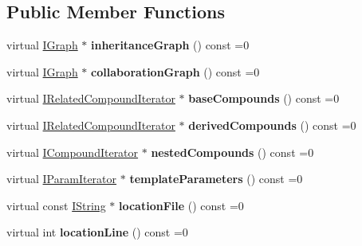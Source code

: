 \subsection*{Public Member Functions}
\begin{DoxyCompactItemize}
\item 
\mbox{\label{class_i_class_a4ca5777a61f96db43cee552fae9ddf10}} 
virtual \mbox{\hyperlink{class_i_graph}{I\+Graph}} $\ast$ {\bfseries inheritance\+Graph} () const =0
\item 
\mbox{\label{class_i_class_a2d4a0dacd92ac09748c330c3c4ec8dd6}} 
virtual \mbox{\hyperlink{class_i_graph}{I\+Graph}} $\ast$ {\bfseries collaboration\+Graph} () const =0
\item 
\mbox{\label{class_i_class_ad56d72fa47a2bdd86b5e6e6ca276c310}} 
virtual \mbox{\hyperlink{class_i_related_compound_iterator}{I\+Related\+Compound\+Iterator}} $\ast$ {\bfseries base\+Compounds} () const =0
\item 
\mbox{\label{class_i_class_a13263a570c7855f31b95318a454c9d31}} 
virtual \mbox{\hyperlink{class_i_related_compound_iterator}{I\+Related\+Compound\+Iterator}} $\ast$ {\bfseries derived\+Compounds} () const =0
\item 
\mbox{\label{class_i_class_a5d0a9550c8d89d48035b51b6ca8d11d8}} 
virtual \mbox{\hyperlink{class_i_compound_iterator}{I\+Compound\+Iterator}} $\ast$ {\bfseries nested\+Compounds} () const =0
\item 
\mbox{\label{class_i_class_af0da20c3596106218074774917779d08}} 
virtual \mbox{\hyperlink{class_i_param_iterator}{I\+Param\+Iterator}} $\ast$ {\bfseries template\+Parameters} () const =0
\item 
\mbox{\label{class_i_class_a7c065c49fb1cb6e6dc35a1f1510e998f}} 
virtual const \mbox{\hyperlink{class_i_string}{I\+String}} $\ast$ {\bfseries location\+File} () const =0
\item 
\mbox{\label{class_i_class_a0b739d8c75ca4364048d103f3cbd6407}} 
virtual int {\bfseries location\+Line} () const =0
\item 
\mbox{\label{class_i_class_a27bb881d8684d834d02893de5a8dfda9}} 

\end{DoxyCompactItemize}
